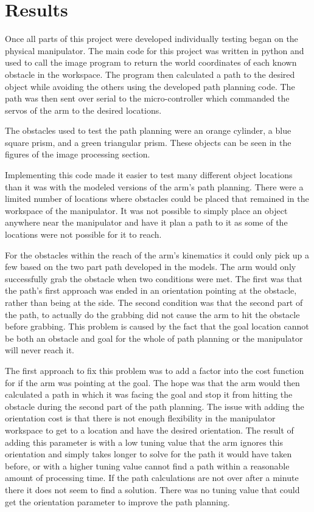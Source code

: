 \chapter{Results}
Once all parts of this project were developed individually testing began on the physical manipulator. The main code for this project was written in python and used to call the image program to return the world coordinates of each known obstacle in the workspace. The program then calculated a path to the desired object while avoiding the others using the developed path planning code. The path was then sent over serial to the micro-controller which commanded the servos of the arm to the desired locations. 

The obstacles used to test the path planning were an orange cylinder, a blue square prism, and a green triangular prism. These objects can be seen in the figures of the image processing section.

Implementing this code made it easier to test many different object locations than it was with the modeled versions of the arm's path planning. There were a limited number of locations where obstacles could be placed that remained in the workspace of the manipulator. It was not possible to simply place an object anywhere near the manipulator and have it plan a path to it as some of the locations were not possible for it to reach.

For the obstacles within the reach of the arm's kinematics it could only pick up a few based on the two part path developed in the models. The arm would only successfully grab the obstacle when two conditions were met. The first was that the path's first approach was ended in an orientation pointing at the obstacle, rather than being at the side. The second condition was that the second part of the path, to actually do the grabbing did not cause the arm to hit the obstacle before grabbing. This problem is caused by the fact that the goal location cannot be both an obstacle and goal for the whole of path planning or the manipulator will never reach it. 

The first approach to fix this problem was to add a factor into the cost function for if the arm was pointing at the goal. The hope was that the arm would then calculated a path in which it was facing the goal and stop it from hitting the obstacle during the second part of the path planning. The issue with adding the orientation cost is that there is not enough flexibility in the manipulator workspace to get to a location and have the desired orientation. The result of adding this parameter is with a low tuning value that the arm ignores this orientation and simply takes longer to solve for the path it would have taken before, or with a higher tuning value cannot find a path within a reasonable amount of processing time. If the path calculations are not over after a minute there it does not seem to find a solution. There was no tuning value that could get the orientation parameter to improve the path planning.

